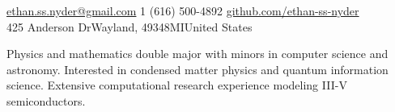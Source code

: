 \documentclass[11pt,a4paper]{article} %
\begin{document}
 



\noindent\href{mailto:ethan.ss.nyder@gmail.com}{ethan.ss.nyder@gmail.com}\bull %
\textsmaller{+}1 (616) 500-4892\bull %
\href{https://github.com/ethan-ss-nyder}{github.com/ethan-ss-nyder}\\ %
425 Anderson Dr\bull Wayland, 49348\bull MI\bull United States %

\spacedhrule{0.4em}{-.8em} %




Physics and mathematics double major with minors in computer science and astronomy. Interested in condensed matter physics and quantum information science. Extensive computational research experience modeling III-V semiconductors.


\spacedhrule{0.5em}{-0.4em} %


\end{document}
